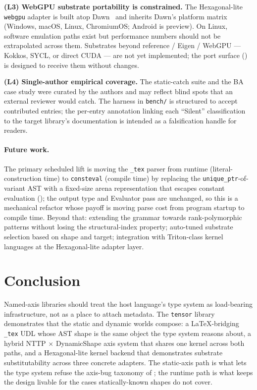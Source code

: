\documentclass[10pt,twocolumn]{article}
\newcommand{\udltex}{\code{\_tex}}                            %
\newcommand{\code}[1]{\texttt{#1}}
\begin{document}
\textbf{(L3) WebGPU substrate portability is constrained.}
The Hexagonal-lite \code{webgpu} adapter is built atop
Dawn~\cite{dawn} and inherits Dawn's platform matrix
(Windows, macOS, Linux, ChromiumOS; Android is preview). On Linux,
software emulation paths exist but performance numbers should not be
extrapolated across them. Substrates beyond reference / Eigen /
WebGPU --- Kokkos, SYCL, or direct CUDA --- are not yet implemented;
the port surface () is designed to receive them
without changes.

\textbf{(L4) Single-author empirical coverage.}
The static-catch suite and the BA case study were curated by the
authors and may reflect blind spots that an external reviewer would
catch. The harness in \code{bench/} is structured to accept
contributed entries; the per-entry annotation linking each
``Silent'' classification to the target library's documentation is
intended as a falsification handle for readers.

\paragraph{Future work.}
The primary scheduled lift is moving the \udltex{} parser from
runtime (literal-construction time) to \code{consteval} (compile
time) by replacing the \code{unique\_ptr}-of-variant AST with a
fixed-size arena representation that escapes constant evaluation
(); the output type and Evaluator
pass are unchanged, so this is a mechanical refactor whose payoff
is moving parse cost from program startup to compile time. Beyond that: extending the grammar towards
rank-polymorphic patterns without losing the structural-index
property; auto-tuned substrate selection based on shape and target;
integration with Triton-class kernel languages at the Hexagonal-lite
adapter layer.

\section{Conclusion}
\label{sec:conclusion}

Named-axis libraries should treat the host language's type system as
load-bearing infrastructure, not as a place to attach metadata. The
\code{tensor} library demonstrates that the static and dynamic worlds
compose: a LaTeX-bridging \udltex{} UDL whose AST shape is the same
object the type system reasons about, a hybrid NTTP $\times$
DynamicShape axis system that shares one kernel across both paths,
and a Hexagonal-lite kernel backend that demonstrates substrate
substitutability across three concrete adapters. The static-axis
path is what lets the type system refuse the axis-bug taxonomy of
; the runtime path is what keeps the design
livable for the cases statically-known shapes do not cover.
\end{document}
